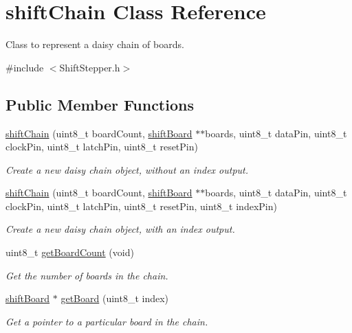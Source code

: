\hypertarget{classshift_chain}{
\section{shiftChain Class Reference}
\label{classshift_chain}
}


Class to represent a daisy chain of boards.  




{\ttfamily \#include $<$ShiftStepper.h$>$}

\subsection*{Public Member Functions}
\begin{DoxyCompactItemize}
\item 
\hyperlink{classshift_chain_a195e5184202ba7408c5d4e5c9a568942}{shiftChain} (uint8\_\-t boardCount, \hyperlink{classshift_board}{shiftBoard} $\ast$$\ast$boards, uint8\_\-t dataPin, uint8\_\-t clockPin, uint8\_\-t latchPin, uint8\_\-t resetPin)
\begin{DoxyCompactList}\small\item\em Create a new daisy chain object, without an index output. \item\end{DoxyCompactList}\item 
\hyperlink{classshift_chain_a18e8f5846d6fcece74e38051ce953467}{shiftChain} (uint8\_\-t boardCount, \hyperlink{classshift_board}{shiftBoard} $\ast$$\ast$boards, uint8\_\-t dataPin, uint8\_\-t clockPin, uint8\_\-t latchPin, uint8\_\-t resetPin, uint8\_\-t indexPin)
\begin{DoxyCompactList}\small\item\em Create a new daisy chain object, with an index output. \item\end{DoxyCompactList}\item 
uint8\_\-t \hyperlink{classshift_chain_a580a9110d442bcf5c251ad2618b7943d}{getBoardCount} (void)
\begin{DoxyCompactList}\small\item\em Get the number of boards in the chain. \item\end{DoxyCompactList}\item 
\hyperlink{classshift_board}{shiftBoard} $\ast$ \hyperlink{classshift_chain_a625ee1a0a7dcf77c5895391a58667267}{getBoard} (uint8\_\-t index)
\begin{DoxyCompactList}\small\item\em Get a pointer to a particular board in the chain. \item\end{DoxyCompactList}\item 

\end{DoxyCompactItemize}
